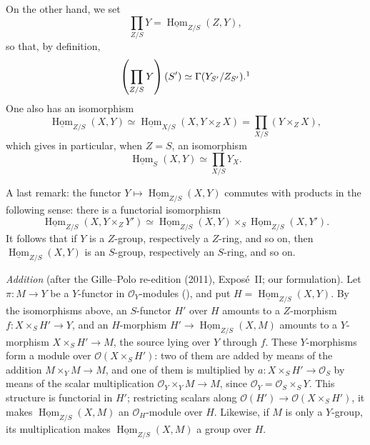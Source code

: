 On the other hand, we set
\[
  \prod_{Z/S}Y
  =\underline{\operatorname{Hom}}_{Z/S}(Z,Y),
\]
so that, by definition,
\[
  \left(\prod_{Z/S}Y\right)(S')
  \simeq \Gamma(Y_{S'}/Z_{S'}).\footnotemark
\]
One also has an isomorphism
\[
  \underline{\operatorname{Hom}}_{Z/S}(X,Y)
  \simeq
  \underline{\operatorname{Hom}}_{X/S}(X,Y\times_ZX)
  =\prod_{X/S}(Y\times_ZX),
\]
which gives in particular, when \(Z=S\), an isomorphism
\[
  \underline{\operatorname{Hom}}_S(X,Y)
  \simeq \prod_{X/S}Y_X.
\]

%
A last remark: the functor
\(Y\mapsto\underline{\operatorname{Hom}}_{Z/S}(X,Y)\) commutes with
products in the following sense: there is a functorial isomorphism
\[
  \underline{\operatorname{Hom}}_{Z/S}(X,Y\times_ZY')
  \simeq
  \underline{\operatorname{Hom}}_{Z/S}(X,Y)
  \times_S
  \underline{\operatorname{Hom}}_{Z/S}(X,Y').
\]
It follows that if \(Y\) is a \(Z\)-group, respectively a \(Z\)-ring,
and so on, then \(\underline{\operatorname{Hom}}_{Z/S}(X,Y)\) is an
\(S\)-group, respectively an \(S\)-ring, and so on.

\par\medskip\noindent
\emph{Addition} (after the Gille--Polo re-edition (2011), Expos\'e~II; our
formulation). Let \(\pi\colon M\to Y\) be a \(Y\)-functor in
\(\mathcal O_Y\)-modules (), and put
\(H=\underline{\operatorname{Hom}}_{Z/S}(X,Y)\). By the isomorphisms above,
an \(S\)-functor \(H'\) over \(H\) amounts to a \(Z\)-morphism
\(f\colon X\times_SH'\to Y\), and an \(H\)-morphism
\(H'\to\underline{\operatorname{Hom}}_{Z/S}(X,M)\) amounts to a
\(Y\)-morphism \(X\times_SH'\to M\), the source lying over \(Y\) through
\(f\). These \(Y\)-morphisms form a module over \(\mathcal O(X\times_SH')\):
two of them are added by means of the addition \(M\times_YM\to M\), and one
of them is multiplied by \(a\colon X\times_SH'\to\mathcal O_S\) by means of
the scalar multiplication \(\mathcal O_Y\times_YM\to M\), since
\(\mathcal O_Y=\mathcal O_S\times_SY\). This structure is functorial in
\(H'\); restricting scalars along
\(\mathcal O(H')\to\mathcal O(X\times_SH')\), it makes
\(\underline{\operatorname{Hom}}_{Z/S}(X,M)\) an \(\mathcal O_H\)-module over
\(H\). Likewise, if \(M\) is only a \(Y\)-group, its multiplication makes
\(\underline{\operatorname{Hom}}_{Z/S}(X,M)\) a group over \(H\).
\par\medskip

